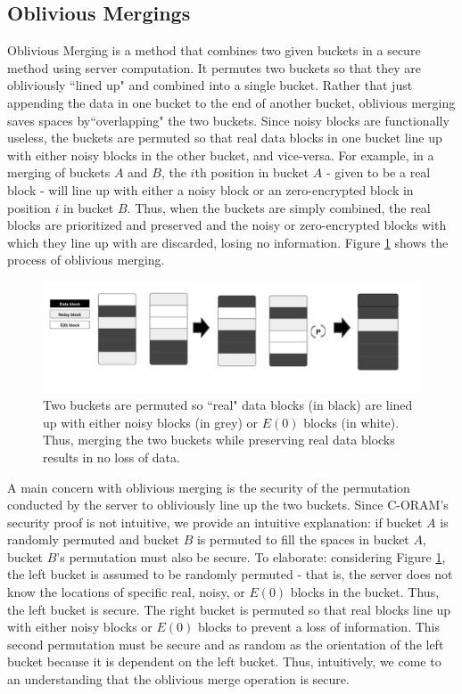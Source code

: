 \documentclass[12pt, oneside]{article}   	%
\begin{document}
\subsection{Oblivious Mergings}
Oblivious Merging is a method that combines two given buckets in a secure method using server computation. It permutes two buckets so that they are obliviously ``lined up" and combined into a single bucket. Rather that just appending the data in one bucket to the end of another bucket, oblivious merging saves spaces by``overlapping" the two buckets. Since noisy blocks are functionally useless, the buckets are permuted so that real data blocks in one bucket line up with either noisy blocks in the other bucket, and vice-versa. For example, in a merging of buckets $A$ and $B$, the $i$th position in bucket $A$ - given to be a real block - will line up with either a noisy block or an zero-encrypted block in position $i$ in bucket $B$. Thus, when the buckets are simply combined, the real blocks are prioritized and preserved and the noisy or zero-encrypted blocks with which they line up with are discarded, losing no information. Figure \ref{fig:merge} shows the process of oblivious merging. 

\begin{figure}[h!]
  \includegraphics[width=\linewidth]{merge}
  \caption{Two buckets are permuted so ``real" data blocks (in black) are lined up with either noisy blocks (in grey) or $E (0)$ blocks (in white). Thus, merging the two buckets while preserving real data blocks results in no loss of data.}
  \label{fig:merge}
\end{figure}

A main concern with oblivious merging is the security of the permutation conducted by the server to obliviously line up the two buckets. Since C-ORAM's security proof is not intuitive, we provide an intuitive explanation: if bucket $A$ is randomly permuted and bucket $B$ is permuted to fill the spaces in bucket $A$, bucket $B$'s permutation must also be secure. To elaborate: considering Figure \ref{fig:merge}, the left bucket is assumed to be randomly permuted - that is, the server does not know the locations of specific real, noisy, or $E (0)$ blocks in the bucket. Thus, the left bucket is secure. The right bucket is permuted so that real blocks line up with either noisy blocks or $E (0)$ blocks to prevent a loss of information. This second permutation must be secure and as random as the orientation of the left bucket because it is dependent on the left bucket. Thus, intuitively, we come to an understanding that the oblivious merge operation is secure.
\end{document}

